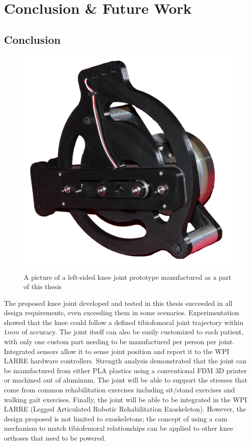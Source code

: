\chapter{Conclusion \& Future Work}

\section{Conclusion}

\begin{figure}[ht!]
    \centering
    \includegraphics[width=0.7\linewidth]{Figures/KneeJointPrototype_ClearBackground.png}
    \caption{A picture of a left-sided knee joint prototype manufactured as a part of this thesis}
    \label{fig:KneeJointPicture}
\end{figure}

The proposed knee joint developed and tested in this thesis succeeded in all design requirements, even exceeding them in some scenarios. Experimentation showed that the knee could follow a defined tibiofemoral joint trajectory within \(1mm\) of accuracy. The joint itself can also be easily customized to each patient, with only one custom part needing to be manufactured per person per joint. Integrated sensors allow it to sense joint position and report it to the WPI LARRE hardware controllers. Strength analysis demonstrated that the joint can be manufactured from either PLA plastics using a conventional FDM 3D printer or machined out of aluminum. The joint will be able to support the stresses that come from common rehabilitation exercises including sit/stand exercises and walking gait exercises. Finally, the joint will be able to be integrated in the WPI LARRE (Legged Articulated Robotic Rehabilitation Exoskeleton). However, the design proposed is not limited to exoskeletons; the concept of using a cam mechanism to match tibiofemoral relationships can be applied to other knee orthoses that need to be powered.

